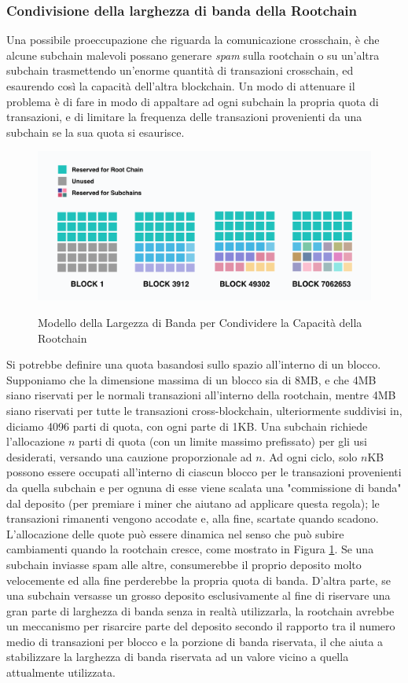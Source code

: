 \subsubsection{Condivisione della larghezza di banda della Rootchain}
Una possibile proeccupazione che riguarda la comunicazione crosschain, è che alcune subchain malevoli possano generare \emph{spam} sulla rootchain o su un'altra subchain trasmettendo un'enorme quantità di transazioni crosschain, ed esaurendo così la capacità dell'altra blockchain. Un modo di attenuare il problema è di fare in modo di appaltare ad ogni subchain la propria quota di transazioni, e di limitare la frequenza delle transazioni provenienti da una subchain se la sua quota si esaurisce.

\begin{figure}[ht]
	\includegraphics[width=\textwidth]{Figura3.png}
	\label{fig:fig3}
	\caption{Modello della Largezza di Banda per Condividere la Capacità della Rootchain}
\end{figure}

Si potrebbe definire una quota basandosi sullo spazio all'interno di un blocco. Supponiamo che la dimensione massima di un blocco sia di 8MB, e che 4MB siano riservati per le normali transazioni all'interno della rootchain, mentre 4MB siano riservati per tutte le transazioni cross-blockchain, ulteriormente suddivisi in, diciamo 4096 parti di quota, con ogni parte di 1KB. Una subchain richiede l'allocazione $n$ parti di quota (con un limite massimo prefissato) per gli usi desiderati, versando una cauzione proporzionale ad $n$. Ad ogni ciclo, solo $n$KB possono essere occupati all'interno di ciascun blocco per le transazioni provenienti da quella subchain e per ognuna di esse viene scalata una "commissione di banda" dal deposito (per premiare i miner che aiutano ad applicare questa regola); le transazioni rimanenti vengono accodate e, alla fine, scartate quando scadono. L'allocazione delle quote può essere dinamica nel senso che può subire cambiamenti quando la rootchain cresce, come mostrato in Figura \ref{fig:fig3}. Se una subchain inviasse spam alle altre, consumerebbe il proprio deposito molto velocemente ed alla fine perderebbe la propria quota di banda. D'altra parte, se una subchain versasse un grosso deposito esclusivamente al fine di riservare una gran parte di larghezza di banda senza in realtà utilizzarla, la rootchain avrebbe un meccanismo per risarcire parte del deposito secondo il rapporto tra il numero medio di transazioni per blocco e la porzione di banda riservata, il che aiuta a stabilizzare la larghezza di banda riservata ad un valore vicino a quella attualmente utilizzata.